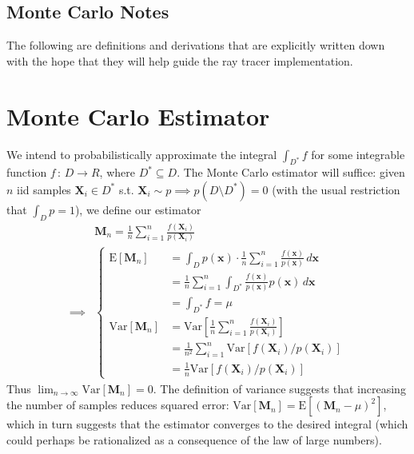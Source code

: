 \documentclass{article}
\newcommand{\E}{\mathrm{E}}
\newcommand{\Var}{\mathrm{Var}}
\begin{document}
  \begin{center}
    \section*{Monte Carlo Notes}
  \end{center}
  
  The following are definitions and derivations that 
  are explicitly written down with the hope that 
  they will help guide the ray tracer implementation.

  \section{Monte Carlo Estimator}

  We intend to probabilistically approximate the integral $\int_{D^\ast}f$ for some 
  integrable function $f\,:\,D\to R$, where $D^\ast \subseteq D$.
  The Monte Carlo estimator will suffice:
  given $n$ iid samples $\bm{X}_i \in D^\ast$ s.t. $\bm{X}_i \sim p \implies 
  p(D \setminus D^\ast) = 0$ 
  (with the usual restriction that $\int_{D} p = 1$), we define our estimator 
  \begin{align*}
    &\bm{M}_n = \frac{1}{n}\sum_{i=1}^{n} \frac{f(\bm{X}_i)}{p(\bm{X}_i)}\\
    \implies &\begin{cases}
      \E[\bm{M}_n] &= \int_{D}p(\bm{x})\cdot\frac{1}{n}\sum_{i=1}^{n} \frac{f(\bm{x})}{p(\bm{x})}\,d\bm{x}\\
                   &= \frac{1}{n}\sum_{i=1}^{n}
                      \int_{D^\ast}\frac{f(\bm{x})}{p(\bm{x})} p(\bm{x})\,d\bm{x}\\
                   &= \int_{D^\ast}f = \mu\\
      \Var[\bm{M}_n] &= \Var[\frac{1}{n}\sum_{i=1}^{n} \frac{f(\bm{X}_i)}{p(\bm{X}_i)}]\\
                     &= \frac{1}{n^2}\sum_{i=1}^{n}\Var[f(\bm{X}_i) / p(\bm{X}_i)]\\
                     &= \frac{1}{n}\Var[f(\bm{X}_i) / p(\bm{X}_i)]
    \end{cases}
  \end{align*}
  Thus $\lim_{n \to \infty} \Var[\bm{M}_n] = 0$. 
  The definition of variance suggests that 
  increasing the number of samples reduces 
  squared error: $\Var[\bm{M}_n] = \E[(\bm{M}_n - \mu)^2]$, 
  which in turn suggests that the estimator converges to the desired integral 
  (which could perhaps be rationalized as a consequence of the law of large numbers).
\end{document}
